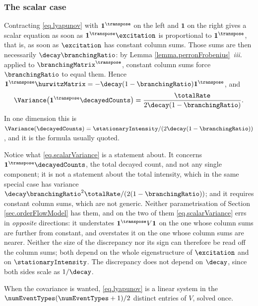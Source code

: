 \subsubsection{The scalar case}

Contracting \eqref{eq.lyapunov} with $\mathbf{1}^{\transpose}$ on the left and
$\mathbf{1}$ on the right gives a scalar equation as soon as
$\mathbf{1}^{\transpose}\excitation$ is proportional to $\mathbf{1}^{\transpose}$,
that is, as soon as $\excitation$ has constant column sums.
Those sums are then necessarily $\decay\branchingRatio$:
by Lemma \ref{lemma.perronFrobenius}~\emph{iii.} applied to $\branchingMatrix^{\transpose}$,
constant column sums force $\branchingRatio$ to equal them.
Hence
$\mathbf{1}^{\transpose}\hurwitzMatrix
= -\decay(1-\branchingRatio)\mathbf{1}^{\transpose}$, and
\begin{equation}\label{eq.scalarVariance}
 \Variance \big( \mathbf{1}^{\transpose}\decayedCounts \big)
 = \frac{\totalRate}{2\decay(1-\branchingRatio)} .
\end{equation}
In one dimension this is
$\Variance(\decayedCounts) = \stationaryIntensity/(2\decay(1-\branchingRatio))$,
and it is the formula usually quoted.

\begin{remark}\label{remark.scalarVariance}
 Notice what \eqref{eq.scalarVariance} is a statement about.
 It concerns $\mathbf{1}^{\transpose}\decayedCounts$, the total decayed count,
 and not any single component;
 it is not a statement about the total intensity,
 which in the same special case has variance
 $\decay\branchingRatio^{2}\totalRate/(2(1-\branchingRatio))$;
 and it requires constant column sums, which are not generic.
 Neither parametrisation of Section \ref{sec.orderFlowModel} has them,
 and on the two of them \eqref{eq.scalarVariance} errs in \emph{opposite} directions:
 it understates $\mathbf{1}^{\transpose}V\mathbf{1}$ on the one whose column sums are
 further from constant, and overstates it on the one whose column sums are nearer.
 Neither the size of the discrepancy nor its sign can therefore be read off the column
 sums; both depend on the whole eigenstructure of $\excitation$ and on
 $\stationaryIntensity$.
 The discrepancy does not depend on $\decay$, since both sides scale as $1/\decay$.
\end{remark}

When the covariance is wanted, \eqref{eq.lyapunov} is a linear system in the
$\numEventTypes(\numEventTypes+1)/2$ distinct entries of $V$,
solved once.
